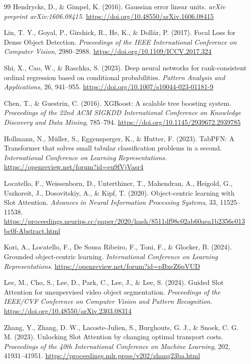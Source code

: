 \documentclass[12pt,a4paper]{article}
\begin{document}
\begin{thebibliography}{99}
Hendrycks, D., \& Gimpel, K. (2016).
Gaussian error linear units.
\textit{arXiv preprint arXiv:1606.08415}.
\url{https://doi.org/10.48550/arXiv.1606.08415}

Lin, T. Y., Goyal, P., Girshick, R., He, K., \& Dollár, P. (2017).
Focal Loss for Dense Object Detection.
\textit{Proceedings of the IEEE International Conference on Computer Vision}, 2980--2988.
\url{https://doi.org/10.1109/ICCV.2017.324}

Shi, X., Cao, W., \& Raschka, S. (2023).
Deep neural networks for rank-consistent ordinal regression based on conditional probabilities.
\textit{Pattern Analysis and Applications}, 26, 941--955.
\url{https://doi.org/10.1007/s10044-023-01181-9}

Chen, T., \& Guestrin, C. (2016).
XGBoost: A scalable tree boosting system.
\textit{Proceedings of the 22nd ACM SIGKDD International Conference on Knowledge Discovery and Data Mining}, 785--794.
\url{https://doi.org/10.1145/2939672.2939785}

Hollmann, N., Müller, S., Eggensperger, K., \& Hutter, F. (2023).
TabPFN: A Transformer that solves small tabular classification problems in a second.
\textit{International Conference on Learning Representations}.
\url{https://openreview.net/forum?id=eu9fVjVasr4}

Locatello, F., Weissenborn, D., Unterthiner, T., Mahendran, A., Heigold, G., Uszkoreit, J., Dosovitskiy, A., \& Kipf, T. (2020).
Object-centric learning with Slot Attention.
\textit{Advances in Neural Information Processing Systems}, 33, 11525--11538.
\url{https://proceedings.neurips.cc/paper/2020/hash/8511df98c02ab60aea1b2356c013bc0f-Abstract.html}

Kori, A., Locatello, F., De Sousa Ribeiro, F., Toni, F., \& Glocker, B. (2024).
Grounded object-centric learning.
\textit{International Conference on Learning Representations}.
\url{https://openreview.net/forum?id=pBxeZ6pVUD}

Lee, M., Cho, S., Lee, D., Park, C., Lee, J., \& Lee, S. (2024).
Guided Slot Attention for unsupervised video object segmentation.
\textit{Proceedings of the IEEE/CVF Conference on Computer Vision and Pattern Recognition}.
\url{https://doi.org/10.48550/arXiv.2303.08314}

Zhang, Y., Zhang, D. W., Lacoste-Julien, S., Burghouts, G. J., \& Snoek, C. G. M. (2023).
Unlocking Slot Attention by changing optimal transport costs.
\textit{Proceedings of the 40th International Conference on Machine Learning}, 202, 41931--41951.
\url{https://proceedings.mlr.press/v202/zhang23ba.html}


\end{thebibliography}
\end{document}
